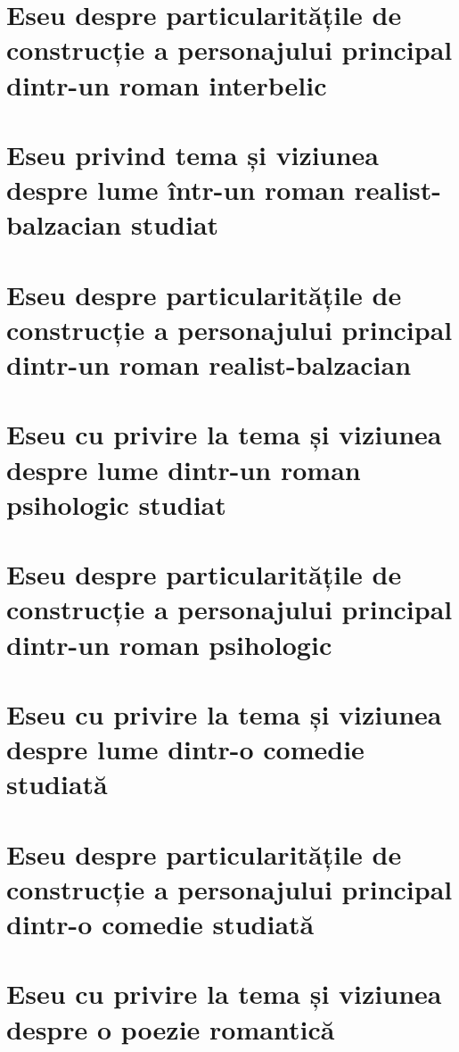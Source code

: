 \documentclass[
 12pt,                       %
 a4paper                     %
]{book}
\begin{document}
\chapter{Eseu despre particularitățile de construcție a personajului principal dintr-un roman interbelic}



\chapter{Eseu privind tema și viziunea despre lume într-un roman realist-balzacian studiat}


\chapter{Eseu despre particularitățile de construcție a personajului principal dintr-un roman realist-balzacian}



\chapter{Eseu cu privire la tema și viziunea despre lume dintr-un roman psihologic studiat}


\chapter{Eseu despre particularitățile de construcție a personajului principal dintr-un roman psihologic}



\chapter{Eseu cu privire la tema și viziunea despre lume dintr-o comedie studiată}


\chapter{Eseu despre particularitățile de construcție a personajului principal dintr-o comedie studiată}



\chapter{Eseu cu privire la tema și viziunea despre o poezie romantică}

\end{document}
